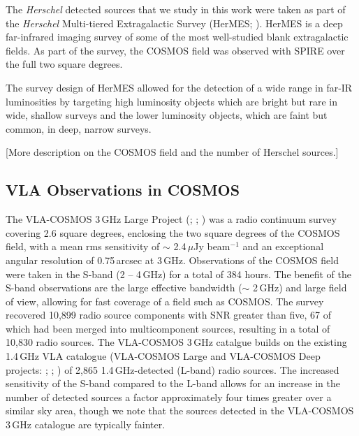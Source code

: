 The \textit{Herschel} detected sources that we study in this work were taken as part of the \textit{Herschel} Multi-tiered Extragalactic Survey (HerMES; \citealt{Oliver_2012}). HerMES is a deep far-infrared imaging survey of some of the most well-studied blank extragalactic fields. As part of the survey, the COSMOS field was observed with SPIRE over the full two square degrees.

The survey design of HerMES allowed for the detection of a wide range in far-IR luminosities by targeting high luminosity objects which are bright but rare in wide, shallow surveys and the lower luminosity objects, which are faint but common, in deep, narrow surveys.

{\color{red}[More description on the COSMOS field and the number of Herschel sources.]}

\subsection{VLA Observations in COSMOS}

The VLA-COSMOS 3\,GHz Large Project (\citealt{Smolcic_2017a}; \citealt{Smolcic_2017b}; \citealt{Smolcic_2017c}) was a radio continuum survey covering 2.6 square degrees, enclosing the two square degrees of the COSMOS field, with a mean rms sensitivity of $\sim$ 2.4\,$\mu$Jy beam$^{-1}$ and an exceptional angular resolution of 0.75\,arcsec at 3\,GHz. Observations of the COSMOS field were taken in the S-band (2 -- 4\,GHz) for a total of 384 hours. The benefit of the S-band observations are the large effective bandwidth ($\sim$ 2\,GHz) and large field of view, allowing for fast coverage of a field such as COSMOS. The survey recovered 10,899 radio source components with SNR greater than five, 67 of which had been merged into multicomponent sources, resulting in a total of 10,830 radio sources. The VLA-COSMOS 3\,GHz catalgue builds on the existing 1.4\,GHz VLA catalogue (VLA-COSMOS Large and VLA-COSMOS Deep projects: \citealt{Schinnerer_2004}; \citealt{Schinnerer_2007}; \citealt{Schinnerer_2010}) of 2,865 1.4\,GHz-detected (L-band) radio sources. The increased sensitivity of the S-band compared to the L-band allows for an increase in the number of detected sources a factor approximately four times greater over a similar sky area, though we note that the sources detected in the VLA-COSMOS 3\,GHz catalogue are typically fainter.

